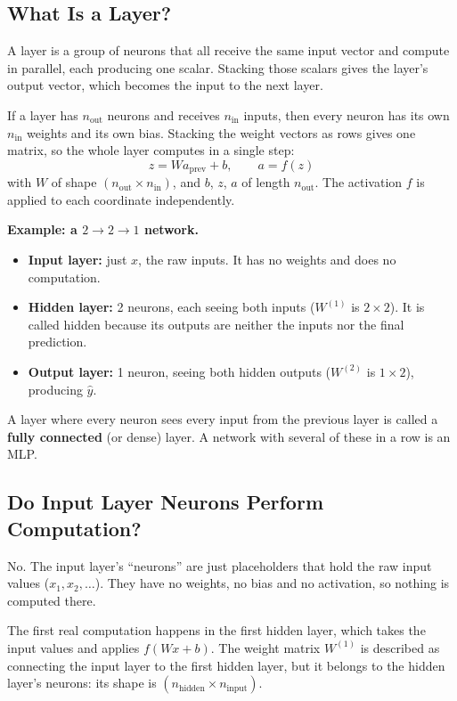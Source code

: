 \subsection*{What Is a Layer?}

A layer is a group of neurons that all receive the same input vector and compute in parallel, each producing one scalar. Stacking those scalars gives the layer's output vector, which becomes the input to the next layer.

If a layer has $n_{\text{out}}$ neurons and receives $n_{\text{in}}$ inputs, then every neuron has its own $n_{\text{in}}$ weights and its own bias. Stacking the weight vectors as rows gives one matrix, so the whole layer computes in a single step:
\[
z = W a_{\text{prev}} + b, \qquad a = f(z)
\]
with $W$ of shape $(n_{\text{out}} \times n_{\text{in}})$, and $b$, $z$, $a$ of length $n_{\text{out}}$. The activation $f$ is applied to each coordinate independently.

\textbf{Example: a $2 \to 2 \to 1$ network.}
\begin{itemize}
    \item \textbf{Input layer:} just $x$, the raw inputs. It has no weights and does no computation.
    \item \textbf{Hidden layer:} 2 neurons, each seeing both inputs ($W^{(1)}$ is $2 \times 2$). It is called hidden because its outputs are neither the inputs nor the final prediction.
    \item \textbf{Output layer:} 1 neuron, seeing both hidden outputs ($W^{(2)}$ is $1 \times 2$), producing $\hat{y}$.
\end{itemize}

A layer where every neuron sees every input from the previous layer is called a \textbf{fully connected} (or dense) layer. A network with several of these in a row is an MLP.

\subsection*{Do Input Layer Neurons Perform Computation?}

No. The input layer's ``neurons'' are just placeholders that hold the raw input values ($x_1, x_2, \dots$). They have no weights, no bias and no activation, so nothing is computed there.

The first real computation happens in the first hidden layer, which takes the input values and applies $f(Wx + b)$. The weight matrix $W^{(1)}$ is described as connecting the input layer to the first hidden layer, but it belongs to the hidden layer's neurons: its shape is $(n_{\text{hidden}} \times n_{\text{input}})$.


